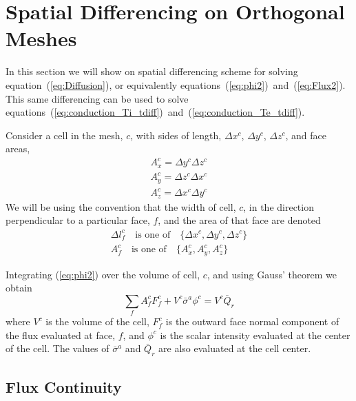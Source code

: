 \documentclass[12pt]{article}
\begin{document}
\section{Spatial Differencing on Orthogonal Meshes}
\label{ap:spatial}

In this section we will show on spatial differencing scheme for solving
equation~(\ref{eq:Diffusion}), or equivalently
equations~(\ref{eq:phi2})~and~(\ref{eq:Flux2}).
This same differencing can be used to solve
equations~(\ref{eq:conduction_Ti_tdiff})~and~(\ref{eq:conduction_Te_tdiff}).

Consider a cell in the mesh, $c$, with sides of length, $\Delta x^{c}$,
$\Delta y^{c}$, $\Delta z^{c}$, and face areas,
\begin{gather}
        A^{c}_{x} = \Delta y^{c} \Delta z^{c} \\
        A^{c}_{y} = \Delta z^{c} \Delta x^{c} \\
        A^{c}_{z} = \Delta x^{c} \Delta y^{c}
\end{gather}
We will be using the convention that the width of cell, $c$, in the direction
perpendicular to a particular face, $f$, and the area of that face are
denoted
\begin{gather}
        \Delta l^{c}_{f} \quad \text{is one of} \quad \{ \Delta x^{c}, 
                                \Delta y^{c}, \Delta z^{c} \} \\
        A^{c}_{f} \quad \text{is one of} \quad \{ A^{c}_{x},
                                 A^{c}_{y}, A^{c}_{z} \}
\end{gather}

Integrating (\ref{eq:phi2}) over the volume of cell, $c$,
and using Gauss' theorem we obtain
\begin{equation}
        \sum_{f} A^{c}_{f} F^{c}_{f} + V^{c} \bar{\sigma}^{a} \phi^{c}
                = V^{c} \bar{Q}_{r}
\label{eq:Balance}
\end{equation}
where $V^{c}$ is the volume of the cell, $F^{c}_{f}$ is the outward face normal
component of the flux evaluated at face, $f$, and $\phi^{c}$ is the
scalar intensity evaluated at the center of the cell.
The values of
$\bar{\sigma}^{a}$ and $\bar{Q}_{r}$ are also evaluated at the cell center.

\subsection{Flux Continuity}
\end{document}
